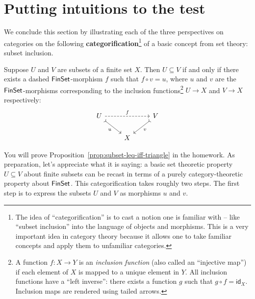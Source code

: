 \section{Putting intuitions to the test}

We conclude this section by illustrating each of the three perspectives
on categories on the following
\textbf{categorification}\footnote{The idea of ``categorification'' is to 
cast a notion one is familiar with -- like ``subset inclusion'' into 
the language of objects and morphisms. This is a very important idea 
in category theory because it allows one to take familiar concepts 
and apply them to unfamiliar categories.} of
a basic concept from set theory: subset inclusion.
\begin{proposition} \label{prop:subset-leq-iff-triangle}
Suppose \(U\) and \(V\) are subsets of a finite set \(X\).
Then \(U \subseteq V\) if and only if
there exists a dashed \(\mathsf{FinSet}\)-morphism \(f\)
such that \(f \circ v = u\),
where \(u\) and \(v\) are the \(\mathsf{FinSet}\)-morphisms
corresponding to the inclusion functions\footnote{A function $f : X \to Y$ 
is an \emph{inclusion function} (also called an ``injective map'') if 
each element of $X$ is mapped to a unique element in $Y$. 
All inclusion functions have a ``left inverse'': 
there exists a function $g$ such that $g \circ f = \mathsf{id}_X$.
Inclusion maps are rendered using tailed arrows.} \(U \to X\) and \(V \to X\)
respectively:
\begin{equation}
\begin{tikzcd}
U \arrow[rd, "u"', tail] \arrow[rr, "f", dashed] &   & V \arrow[ld, "v", tail] \\
                                                 & X &
\end{tikzcd}
\end{equation}
\end{proposition}
You will prove Proposition~\ref{prop:subset-leq-iff-triangle} in the homework.
As preparation,
let's appreciate what it is saying: a basic set theoretic
property \(U\subseteq V\) about finite subsets
can be recast in terms of a purely category-theoretic property
about \(\mathsf{FinSet}\).
This categorification takes roughly two steps.
The first step is to express the subsets \(U\) and \(V\)
as morphisms \(u\) and \(v\).
